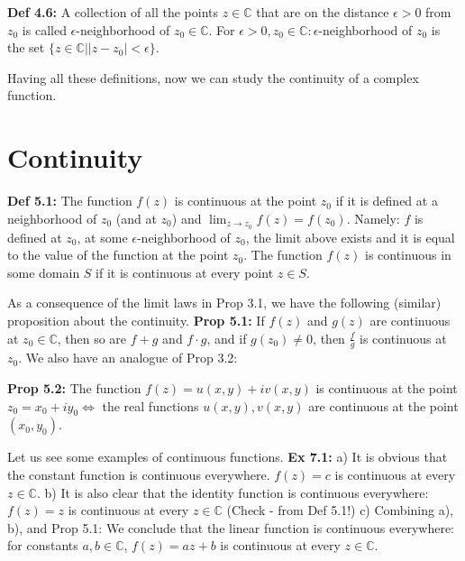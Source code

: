 \documentclass{article}
\begin{document}
\textbf{Def 4.6:} A collection of all the points $z \in \mathbb{C}$ that are on the distance $\epsilon > 0$ from $z_0$ is called $\epsilon$-neighborhood of $z_0 \in \mathbb{C}$. For $\epsilon > 0, z_0 \in \mathbb{C}: \epsilon$-neighborhood of $z_0$ is the set $\{z \in \mathbb{C} | |z - z_0| < \epsilon\}$.

Having all these definitions, now we can study the continuity of a complex function.

\section{Continuity}
\textbf{Def 5.1:} The function $f(z)$ is continuous at the point $z_0$ if it is defined at a neighborhood of $z_0$ (and at $z_0$) and $\lim_{z\to z_0} f(z) = f(z_0)$.
Namely: $f$ is defined at $z_0$, at some $\epsilon$-neighborhood of $z_0$, the limit above exists and it is equal to the value of the function at the point $z_0$.
The function $f(z)$ is continuous in some domain $S$ if it is continuous at every point $z \in S$.

As a consequence of the limit laws in Prop 3.1, we have the following (similar) proposition about the continuity.
\textbf{Prop 5.1:} If $f(z)$ and $g(z)$ are continuous at $z_0 \in \mathbb{C}$, then so are $f+g$ and $f\cdot g$, and if $g(z_0) \neq 0$, then $\frac{f}{g}$ is continuous at $z_0$.
We also have an analogue of Prop 3.2:

\textbf{Prop 5.2:} The function $f(z) = u(x,y) + iv(x,y)$ is continuous at the point $z_0 = x_0 + iy_0 \iff$ the real functions $u(x,y), v(x,y)$ are continuous at the point $(x_0, y_0)$.

Let us see some examples of continuous functions.
\textbf{Ex 7.1:} a) It is obvious that the constant function is continuous everywhere. $f(z) = c$ is continuous at every $z \in \mathbb{C}$.
b) It is also clear that the identity function is continuous everywhere: $f(z) = z$ is continuous at every $z \in \mathbb{C}$ (Check - from Def 5.1!)
c) Combining a), b), and Prop 5.1: We conclude that the linear function is continuous everywhere: for constants $a, b \in \mathbb{C}$, $f(z) = az + b$ is continuous at every $z \in \mathbb{C}$.
\end{document}
